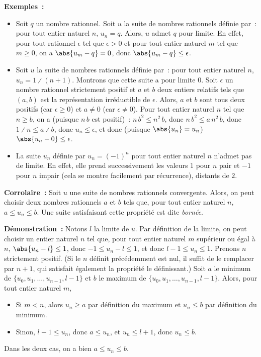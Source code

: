     \done

\medskip

\noindent\textbf{Exemples :} 
\begin{itemize}[nosep]
    \item Soit $q$ un nombre rationnel. 
        Soit $u$ la suite de nombres rationnels définie par : pour tout entier naturel $n$, $u_n = q$.
        Alors, $u$ admet $q$ pour limite.
        En effet, pour tout rationnel $\epsilon$ tel que $\epsilon > 0$ et pour tout entier naturel $m$ tel que $m \geq 0$, on a $\abs{u_m - q} = 0$, donc $\abs{u_m - q} \leq \epsilon$.
    \item Soit $u$ la suite de nombres rationnels définie par : pour tout entier naturel $n$, $u_n = 1 \divslash (n+1)$.
        Montrons que cette suite a pour limite $0$. 
        Soit $\epsilon$ un nombre rationnel strictement positif et $a$ et $b$ deux entiers relatifs tels que $(a, b)$ est la représentation irréductible de $\epsilon$.
        Alors, $a$ et $b$ sont tous deux positifs (car $\epsilon \geq 0$) et $a \neq 0$ (car $\epsilon \neq 0$).
        Pour tout entier naturel $n$ tel que $n \geq b$, on a (puisque $n \, b$ est positif) : $n \, b^2 \leq n^2 \, b$, donc $n \, b^2 \leq a \, n^2 \, b$, donc $1 \divslash n \leq a \divslash b$, donc $u_n \leq \epsilon$, et donc (puisque $\abs{u_n} = u_n$) $\abs{u_n - 0} \leq \epsilon$.
    \item La suite $u_n$ définie par $u_n = (-1)^n$ pour tout entier naturel $n$ n'admet pas de limite.
        En effet, elle prend successivement les valeurs $1$ pour $n$ pair et $-1$ pour $n$ impair (cela se montre facilement par récurrence), distants de $2$. 
\end{itemize}

\medskip

\noindent\textbf{Corrolaire :} Soit $u$ une suite de nombres rationnels convergente.
    Alors, on peut choisir deux nombres rationnels $a$ et $b$ tels que, pour tout entier naturel $n$, $a \leq u_n \leq b$.
    Une suite satisfaisant cette propriété est dite \emph{bornée}.

\medskip

\noindent\textbf{Démonstration :} Notons $l$ la limite de $u$.
    Par définition de la limite, on peut choisir un entier naturel $n$ tel que, pour tout entier naturel $m$ supérieur ou égal à $n$, $\abs{u_n-l} \leq 1$, donc $-1 \leq u_n-l \leq 1$, et donc $l-1 \leq u_n \leq 1$. 
    Prenons $n$ strictement positif.
    (Si le $n$ définit précédemment est nul, il suffit de le remplacer par $n+1$, qui satisfait également la propriété le définissant.)
    Soit $a$ le minimum de $\lbrace u_0, u_1, \dots, u_{n-1}, l-1 \rbrace$ et $b$ le maximum de $\lbrace u_0, u_1, \dots, u_{n-1}, l-1 \rbrace$.
    Alors, pour tout entier naturel $m$, 
    \begin{itemize}[nosep]
        \item Si $m < n$, alors $u_n \geq a$ par définition du maximum et $u_n \leq b$ par définition du minimum.
        \item Sinon, $l-1 \leq u_n$, donc $a \leq u_n$, et $u_n \leq l+1$, donc $u_n \leq b$.
    \end{itemize}
    Dans les deux cas, on a bien $a \leq u_n \leq b$.


